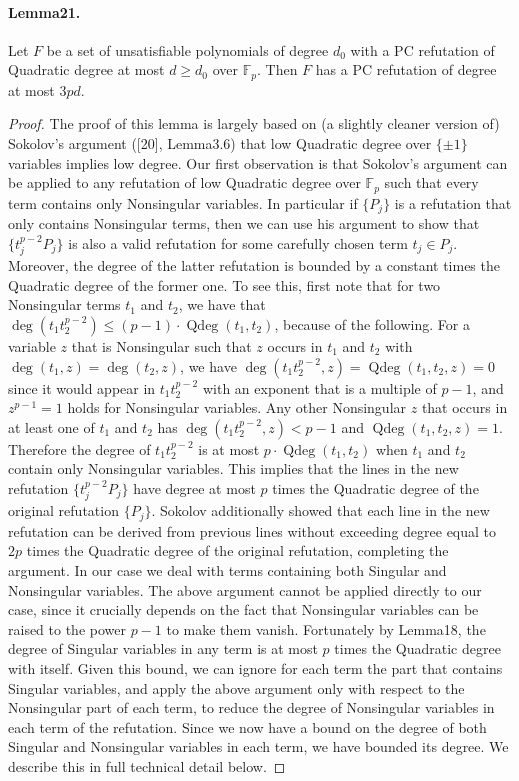 \documentclass[10pt,a4paper]{article}
\DeclareMathOperator{\Qdeg}{Qdeg}
\begin{document}
\paragraph{Lemma21.} Let $F$ be a set of unsatisfiable polynomials of degree $d_0$ with a PC refutation of Quadratic degree at most $d\geq d_0$ over $\mathbb F_p$. Then $F$ has a PC refutation of degree at most $3pd$.
\begin{proof}
The proof of this lemma is largely based on (a slightly cleaner version of) Sokolov's argument ([20], Lemma3.6) that low Quadratic degree over $\{\pm1\}$ variables implies low degree. Our first observation is that Sokolov's argument can be applied to any refutation of low Quadratic degree over $\mathbb F_p$ such that every term contains only Nonsingular variables. In particular if $\{P_j\}$ is a refutation that only contains Nonsingular terms, then we can use his argument to show that $\{t_j^{p-2}P_j\}$ is also a valid refutation for some carefully chosen term $t_j\in P_j$. Moreover, the degree of the latter refutation is bounded by a constant times the Quadratic degree of the former one. To see this, first note that for two Nonsingular terms $t_1$ and $t_2$, we have that $\deg(t_1t_2^{p-2})\leq(p-1)\cdot\Qdeg(t_1,t_2)$, because of the following. For a variable $z$ that is Nonsingular such that $z$ occurs in $t_1$ and $t_2$ with $\deg(t_1,z)=\deg(t_2,z)$, we have $\deg(t_1t_2^{p-2},z)=\Qdeg(t_1,t_2,z)=0$ since it would appear in $t_1t_2^{p-2}$ with an exponent that is a multiple of $p-1$, and $z^{p-1}=1$ holds for Nonsingular variables. Any other Nonsingular $z$ that occurs in at least one of $t_1$ and $t_2$ has $\deg(t_1t_2^{p-2},z)<p-1$ and $\Qdeg(t_1,t_2,z)=1$. Therefore the degree of $t_1t_2^{p-2}$ is at most $p\cdot\Qdeg(t_1,t_2)$ when $t_1$ and $t_2$ contain only Nonsingular variables. This implies that the lines in the new refutation $\{t_j^{p-2}P_j\}$ have degree at most $p$ times the Quadratic degree of the original refutation $\{P_j\}$. Sokolov additionally showed that each line in the new refutation can be derived from previous lines without exceeding degree equal to $2p$ times the Quadratic degree of the original refutation, completing the argument.
In our case we deal with terms containing both Singular and Nonsingular variables. The above argument cannot be applied directly to our case, since it crucially depends on the fact that Nonsingular variables can be raised to the power $p-1$ to make them vanish. Fortunately by Lemma18, the degree of Singular variables in any term is at most $p$ times the Quadratic degree with itself. Given this bound, we can ignore for each term the part that contains Singular variables, and apply the above argument only with respect to the Nonsingular part of each term, to reduce the degree of Nonsingular variables in each term of the refutation. Since we now have a bound on the degree of both Singular and Nonsingular variables in each term, we have bounded its degree. We describe this in full technical detail below.

\end{proof}
\end{document}

